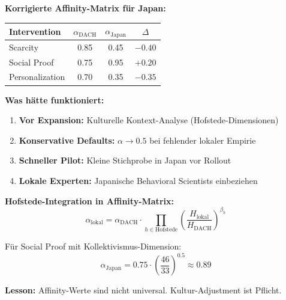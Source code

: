 \begin{tcolorbox}[colback=red!3!white, colframe=red!60!black,
    title=\textbf{Case Study 6: Der Retailer und die japanische Expansion}]
\textbf{Korrigierte Affinity-Matrix für Japan:}
\begin{center}
\begin{tabular}{@{}lccc@{}}
\toprule
\textbf{Intervention} & $\alpha_{\text{DACH}}$ & $\alpha_{\text{Japan}}$ & $\Delta$ \\
\midrule
Scarcity & 0.85 & 0.45 & $-0.40$ \\
Social Proof & 0.75 & 0.95 & $+0.20$ \\
Personalization & 0.70 & 0.35 & $-0.35$ \\
\bottomrule
\end{tabular}
\end{center}

\textbf{Was hätte funktioniert:}
\begin{enumerate}[nosep]
    \item \textbf{Vor Expansion:} Kulturelle Kontext-Analyse (Hofstede-Dimensionen)
    \item \textbf{Konservative Defaults:} $\alpha \rightarrow 0.5$ bei fehlender lokaler Empirie
    \item \textbf{Schneller Pilot:} Kleine Stichprobe in Japan vor Rollout
    \item \textbf{Lokale Experten:} Japanische Behavioral Scientists einbeziehen
\end{enumerate}

\textbf{Hofstede-Integration in Affinity-Matrix:}
\begin{equation*}
\alpha_{\text{lokal}} = \alpha_{\text{DACH}} \cdot \prod_{h \in \text{Hofstede}} \left(\frac{H_{\text{lokal}}}{H_{\text{DACH}}}\right)^{\beta_h}
\end{equation*}

Für Social Proof mit Kollektivismus-Dimension:
\begin{equation*}
\alpha_{\text{Japan}} = 0.75 \cdot \left(\frac{46}{33}\right)^{0.5} \approx 0.89
\end{equation*}

\textbf{Lesson:} \colorbox{yellow!30}{Affinity-Werte sind nicht universal. Kultur-Adjustment ist Pflicht.}

\end{tcolorbox}


